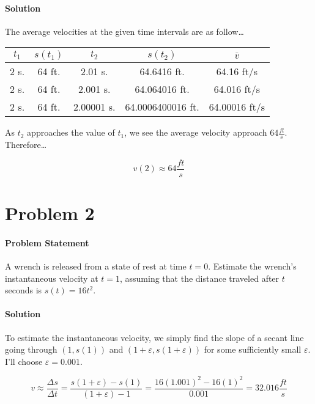 \documentclass{article}
\begin{document}
\begin{enumerate}[(a)]
    \paragraph{Solution} The average velocities at the given time intervals are as follow\dots
    \begin{center}
      \begin{tabular}{||c c c c | c||}
       \hline
       \(t_{1}\) & \(s(t_{1})\) & \(t_{2}\) & \(s(t_{2})\) & \(\overline{v}\) \\
       \hline\hline
       2 s. & 64 ft. & 2.01 s. & 64.6416 ft. & 64.16 ft/s \\
       \hline
       2 s. & 64 ft. & 2.001 s. & 64.064016 ft. & 64.016 ft/s \\
       \hline
       2 s. & 64 ft. & 2.00001 s. & 64.0006400016 ft. & 64.00016 ft/s \\
       \hline
      \end{tabular}
    \end{center}

    As \( t_{2} \) approaches the value of \( t_{1} \), we see the average velocity approach \(64 \frac{ft}{s}\). Therefore\dots

    \begin{equation}
      \boxed{v(2) \approx 64 \frac{ft}{s}}
    \end{equation}
  \end{enumerate}
  \newpage

  \section{Problem 2}
  \paragraph{Problem Statement}
  A wrench is released from a state of rest at time \(t=0\). Estimate the wrench's instantaneous velocity at \(t=1\), assuming that the distance traveled after \(t\) seconds is \(s(t)=16t^2\).

  \paragraph{Solution}
  To estimate the instantaneous velocity, we simply find the slope of a secant line going through \((1, s(1)) \) and \( (1 + \varepsilon, s(1 + \varepsilon)) \) for some sufficiently small \(\varepsilon\). I'll choose \(\varepsilon = 0.001\).

  \begin{equation}
    v \approx \frac{\Delta{s}}{\Delta{t}} = \frac{s(1 + \varepsilon) - s(1)}{(1 + \varepsilon) - 1} = \frac{16(1.001)^2 - 16(1)^2}{0.001} = \boxed{32.016 \frac{ft}{s}}
  \end{equation}
\end{document}
